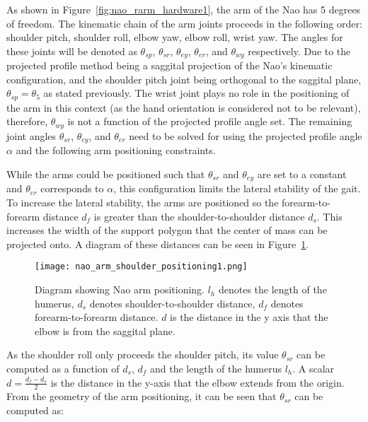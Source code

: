 As shown in Figure~\ref{fig:nao_rarm_hardware1}, the arm of the Nao has 5 degrees of freedom.
The kinematic chain of the arm joints proceeds in the following order: shoulder pitch, shoulder
roll, elbow yaw, elbow roll, wrist yaw. The angles for these joints will be denoted as $\theta_{sp}$,
$\theta_{sr}$, $\theta_{ey}$, $\theta_{er}$, and $\theta_{wy}$ respectively. Due to the projected profile
method being a saggital projection of the Nao's kinematic configuration, and the shoulder pitch joint
being orthogonal to the saggital plane, $\theta_{sp} = \theta_5$ as stated previously. The wrist
joint plays no role in the positioning of the arm in this context (as the hand orientation is considered
not to be relevant), therefore, $\theta_{wy}$ is not a function of the projected profile angle set.
The remaining joint angles $\theta_{sr}$, $\theta_{ey}$, and $\theta_{er}$ 
need to be solved for using the projected profile angle $\alpha$ and the following arm positioning 
constraints.

While the arms could be positioned such that $\theta_{sr}$ and $\theta_{ey}$ are set to a constant
and $\theta_{er}$ corresponds to $\alpha$, this configuration limits the lateral stability of the
gait. To increase the lateral stability, the arms are positioned so the forearm-to-forearm distance $d_f$
is greater than the shoulder-to-shoulder distance $d_s$. This increases the width of the support polygon 
that the center of mass can be projected onto. A diagram of these distances can be seen in 
Figure~\ref{fig:nao_arm_pose1}.

\begin{figure}
	\texttt{[image: nao\_arm\_shoulder\_positioning1.png]}
  	\caption{Diagram showing Nao arm positioning. 
  					 $l_h$ denotes the length of the humerus,
  					 $d_s$ denotes shoulder-to-shoulder distance,
  					 $d_f$ denotes forearm-to-forearm distance.
  					 $d$ is the distance in the y axis that the elbow is from the saggital plane.
  				  }
  	\label{fig:nao_arm_pose1}
\end{figure}


As the shoulder roll only proceeds the shoulder pitch, its value $\theta_{sr}$ can be computed as a function
of $d_s$, $d_f$ and the length of the humerus $l_h$. A scalar $d = \frac{d_f - d_s}{2}$ is
the distance in the y-axis that the elbow extends from the origin.
From the geometry of the arm positioning, it can be seen that $\theta_{sr}$ can be computed as:

